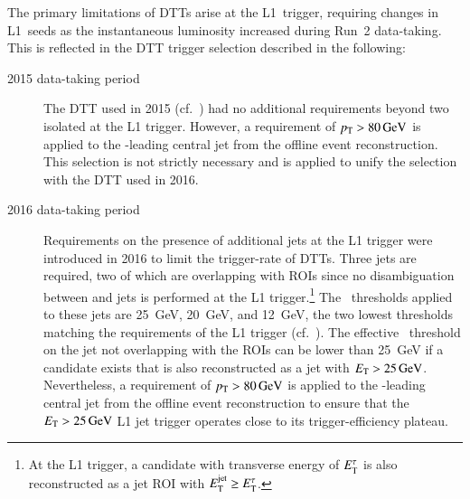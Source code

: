 The primary limitations of DTTs arise at the L1~trigger, requiring changes in
L1~seeds as the instantaneous luminosity increased during Run~2
data-taking. This is reflected in the DTT trigger selection described in the
following:
\begin{description}

\item[2015 data-taking period] The DTT used in 2015
  (cf.~) had no additional requirements beyond two
  isolated \tauhadvis at the L1 trigger. However, a requirement of
  $\pT > \SI{80}{\GeV}$ is applied to the \pT-leading central jet from the
  offline event reconstruction. This selection is not strictly necessary and is
  applied to unify the selection with the DTT used in 2016.

\item[2016 data-taking period] Requirements on the presence of additional jets
  at the L1 trigger were introduced in 2016 to limit the trigger-rate of
  DTTs. Three jets are required, two of which are overlapping with \tauhadvis
  ROIs since no disambiguation between \tauhadvis and jets is performed at the
  L1 trigger.\footnote{At the L1 trigger, a \tauhadvis candidate with transverse
    energy of $E_{\text{T}}^\tau$ is also reconstructed as a jet ROI with
    $E_{\text{T}}^{\text{jet}} \geq E_{\text{T}}^\tau$.} The \ET~thresholds applied to these jets
  are \SI{25}{\GeV}, \SI{20}{\GeV}, and \SI{12}{\GeV}, the two lowest thresholds
  matching the \tauhadvis requirements of the L1 trigger
  (cf.~). The effective \ET~threshold on the jet not
  overlapping with the \tauhadvis ROIs can be lower than \SI{25}{\GeV} if a
  \tauhadvis candidate exists that is also reconstructed as a jet with
  $E_{\text{T}} > \SI{25}{\ensuremath{\text{GeV}}}$. Nevertheless, a requirement of $\pT > \SI{80}{\GeV}$ is
  applied to the \pT-leading central jet from the offline event reconstruction
  to ensure that the $E_{\text{T}} > \SI{25}{\ensuremath{\text{GeV}}}$ L1 jet trigger operates close to its
  trigger-efficiency plateau.


\end{description}
